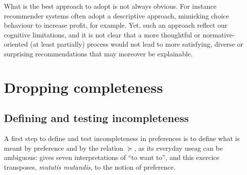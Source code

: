 \documentclass[french, english]{llncs}
\begin{document}
	What is the best approach to adopt is not always obvious. For instance recommender systems often adopt a descriptive approach, mimicking choice behaviour to increase profit, for example. Yet, such an approach reflect our cognitive limitations, and it is not clear that a more thoughtful or normative-oriented (at least partially) process would not lead to more satisfying, diverse or surprising recommendations that may moreover be explainable.
	
	
	

	\section{Dropping completeness}\label{sec:incomp}
	
	
	\subsection{Defining and testing incompleteness}
	\label{sec:empirical}
	A first step to define and test incompleteness in preferences is to define what is meant by preference and by the relation $\succeq$, as its everyday useag can be ambiguous:\citet{frankfurt_freedom_1971} gives seven interpretations of “to want to”, and this exercice transposes, \emph{mutatis mutandis}, to the notion of preference.
	
\end{document}
